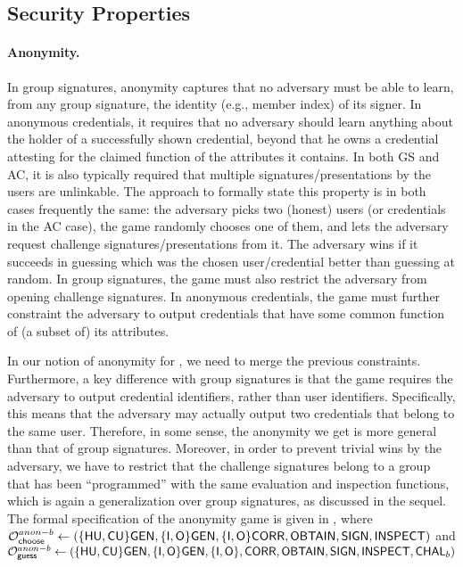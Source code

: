 \subsection{Security Properties}
\label{ssec:security}

\paragraph{Anonymity.} %
In group signatures, anonymity captures that no adversary must be able to learn,
from any group signature, the identity (e.g., member index) of its signer. In 
anonymous credentials, it requires that no adversary should learn anything about
the holder of a successfully shown credential, beyond that he owns a credential
attesting for the claimed function of the attributes it contains. In both GS and
AC, it is also typically required that
multiple signatures/presentations by the users are unlinkable. The approach to
formally state this property is in both cases frequently the same: the adversary
picks two (honest) users (or credentials in the AC case), the game randomly
chooses one of them, and lets the adversary request challenge
signatures/presentations from it. The adversary wins if it succeeds in guessing
which was the chosen user/credential better than guessing at random. In group
signatures, the game must also restrict the adversary from opening challenge
signatures. In anonymous credentials, the game must further constraint the
adversary to output credentials that have some common function of (a subset of)
its attributes.

In our notion of anonymity for \UAS, we need to merge the previous constraints.
Furthermore, a key difference with group signatures is that the game requires
the adversary to output credential identifiers, rather than user identifiers.
Specifically, this means that the adversary may actually output two credentials
that belong to the same user. Therefore, in some sense, the anonymity we get is
more general than that of group signatures. Moreover, in order to prevent
trivial wins by the adversary, we have to restrict that the challenge signatures
belong to a group that has been ``programmed'' with the same evaluation and
inspection functions, which is again a generalization over group signatures,
as discussed in the sequel. The formal specification of the anonymity game is
given in , where $\mathcal{O}^{anon-b}_{\mathsf{choose}} \gets (\lbrace\mathsf{HU},\mathsf{CU}\rbrace
\mathsf{GEN},\lbrace\mathsf{I},\mathsf{O}\rbrace\mathsf{GEN},\lbrace\mathsf{I},\mathsf{O}\rbrace\mathsf{CORR},\mathsf{OBTAIN},\mathsf{SIGN},
\mathsf{INSPECT})$ and $\mathcal{O}^{anon-b}_{\mathsf{guess}} \gets (\lbrace\mathsf{HU},\mathsf{CU}\rbrace\mathsf{GEN},\lbrace\mathsf{I},\mathsf{O}\rbrace
\mathsf{GEN},\lbrace\mathsf{I},\mathsf{O}\rbrace,\mathsf{CORR},\mathsf{OBTAIN},\mathsf{SIGN},\mathsf{INSPECT},\mathsf{CHAL}_b)$

